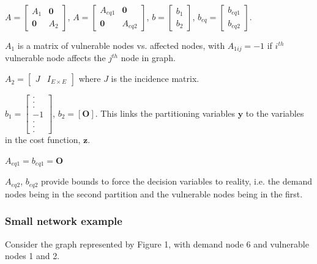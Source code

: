 \documentclass[authoryear,preprint,review,12pt]{elsarticle}
\begin{document}
$A=\left[\begin{array}{cc}
A_{1} & \mathbf{0}\\
\mathbf{0} & A_{2}
\end{array}\right]$, $A=\left[\begin{array}{cc}
A_{eq1} & \mathbf{0}\\
\mathbf{0} & A_{eq2}
\end{array}\right]$, $b=\left[\begin{array}{c}
b_{1}\\
b_{2}
\end{array}\right]$, $b_{eq}=\left[\begin{array}{c}
b_{eq1}\\
b_{eq2}
\end{array}\right]$.

$A_{1}$ is a matrix of vulnerable nodes vs. affected nodes, with
$A_{1ij}=-1$ if $i^{th}$ vulnerable node affects the $j^{th}$ node
in graph.

$A_{2}=\left[\begin{array}{cc}

J & I_{E\times E}\end{array}\right]$ where $J$ is the incidence matrix.


$b_{1}=\left[\begin{array}{c}
.\\
.\\
.\\
-1\\
.\\
.\\
.
\end{array}\right]$,
$b_{2}=\left[\mathbf{O}\right]$. This links the partitioning variables
$\mathbf{y}$ to the variables in the cost function, $\mathbf{z}$.


$A_{eq1}=b_{eq1}=\mathbf{O}$


$A_{eq2}$, $b_{eq2}$ provide bounds to force the decision variables
to reality, i.e. the demand nodes being in the second partition and
the vulnerable nodes being in the first.


\subsubsection{Small network example}

Consider the graph represented by Figure 1, with demand node 6 and
vulnerable nodes 1 and 2.
\end{document}

